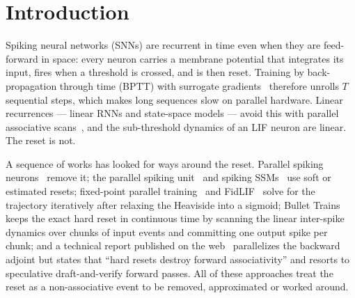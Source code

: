 \documentclass[10pt]{article}
\theoremstyle{remark}
\begin{document}
\begin{abstract}
At the single-stream upper limit ($N=1$, $T=2^{26}$ synthetic Gaussian current), one forward+backward pass drops from $\LongSingleSixSevenGpuFb$\,s (tuned GPU serial) or $\LongSingleSixSevenCpuFb$\,s (\texttt{-O3} C on CPU) to $\LongSingleSixSevenScanFb$\,ms ($\LongSingleSixSevenGpuFbX\times$ vs.\ GPU, $\LongSingleSixSevenCpuFbX\times$ vs.\ CPU); at large batch$\times$width ($N\ge 8$k), tuned serial evaluation wins and an automatic dispatcher selects it.
Relaxed fixed-point training (FPT) gets \FptErrNine\% of spikes wrong at leak 0.9, and exact spike-by-spike restarts slow down with firing rate, unlike the scan.
Separately from scan latency, exact end-to-end gradient fitting (scan or serial) of an adaptive-threshold (ALIF) neuron on $\GlifCellsSpk$ Allen cells outperforms published GLIF~5 models on $\pm 4$\,ms spike timing (paired median $\CmpAlifGFiveFMed$, 95\% CI $[\CmpAlifGFiveFLo,\CmpAlifGFiveFHi]$, $n=\CmpAlifGFiveFN$) with no detectable difference in explained variance ($\CmpAlifGFiveEvMed$, 95\% CI $[\CmpAlifGFiveEvLo,\CmpAlifGFiveEvHi]$, $n=\CmpAlifGFiveEvN$).
\end{abstract}

\section{Introduction}

Spiking neural networks (SNNs) are recurrent in time even when they are feed-forward in space: every neuron carries a membrane potential that integrates its input, fires when a threshold is crossed, and is then reset.
Training by back-propagation through time (BPTT) with surrogate gradients~\citep{neftci2019surrogate} therefore unrolls $T$ sequential steps, which makes long sequences slow on parallel hardware.
Linear recurrences --- linear RNNs and state-space models --- avoid this with parallel associative scans~\citep{blelloch1990prefix,martin2018parallelizing,smith2023s5}, and the sub-threshold dynamics of an LIF neuron are linear.
The reset is not.

A sequence of works has looked for ways around the reset.
Parallel spiking neurons~\citep{fang2023psn} remove it; the parallel spiking unit~\citep{li2024psu} and spiking SSMs~\citep{zhong2024spikessm} use soft or estimated resets; fixed-point parallel training~\citep{feng2025fpt} and FidLIF~\citep{he2026fidlif} solve for the trajectory iteratively after relaxing the Heaviside into a sigmoid; Bullet Trains~\citep{morrill2026bullet} keeps the exact hard reset in continuous time by scanning the linear inter-spike dynamics over chunks of input events and committing one output spike per chunk; and a technical report published on the web~\citep{tachyon2026} parallelizes the backward adjoint but states that ``hard resets destroy forward associativity'' and resorts to speculative draft-and-verify forward passes.
All of these approaches treat the reset as a non-associative event to be removed, approximated or worked around.
\end{document}
